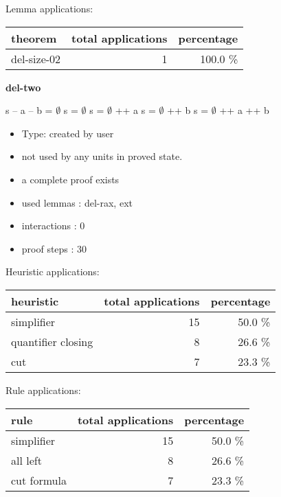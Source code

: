 \documentclass[a4paper]{article}
\begin{document}
Lemma applications:

\begin{supertabular}{l|r|r}
theorem	        & total applications & percentage \\ \hline
del-size-02 & 1 & 100.0 \% \\

\end{supertabular}
\pagebreak

{\LARGE\bf del-two}\label{lemma-del-two}

\medskip

s -- a -- b = $\emptyset$ \Fol s = $\emptyset$ \Or s = $\emptyset$ ++ a \Or s = $\emptyset$ ++ b \Or s = $\emptyset$ ++ a ++ b

\begin{itemize}

\item Type: created by user

\item not used by any units in proved state.
\item       a complete proof exists
\item       used lemmas  : del-rax, ext
\item       interactions : 0
\item       proof steps  : 30
\end{itemize}

\medskip


Heuristic applications:

\begin{supertabular}{l|r|r}
heuristic	& total applications & percentage \\ \hline
simplifier & 15 & 50.0 \% \\
quantifier closing & 8 & 26.6 \% \\
cut & 7 & 23.3 \% \\

\end{supertabular}

Rule applications:

\begin{supertabular}{l|r|r}
rule	        & total applications & percentage \\ \hline
simplifier & 15 & 50.0 \% \\
all left & 8 & 26.6 \% \\
cut formula & 7 & 23.3 \% \\

\end{supertabular}
\end{document}
